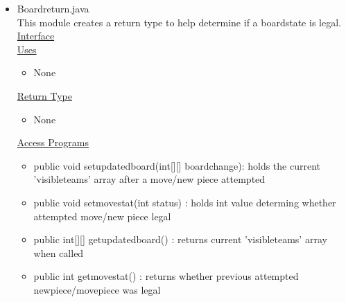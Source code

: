 \documentclass[12pt]{article}
\begin{document}
\begin{itemize}
\begin{itemize}
				\end{itemize}
				\item Boardreturn.java \\
				This module creates a return type to help determine if a boardstate is legal. \\
				\underline{Interface} \\
				\underline{Uses}
				\begin{itemize}
					\item None
				\end{itemize} 
				\underline{Return Type}
				\begin{itemize}
					\item None
				\end{itemize}
				\underline{Access Programs}
				\begin{itemize}
					\item public void setupdatedboard(int[][] boardchange): holds the current 'visibleteams' array after a move/new piece attempted 
					\item public void setmovestat(int status) : holds int value determing whether attempted move/new piece legal
					\item public int[][] getupdatedboard() : returns current 'visibleteams' array when called
					\item public int getmovestat() : returns whether previous attempted newpiece/movepiece was legal

				\end{itemize}
	\end{itemize}
		
\end{document}

